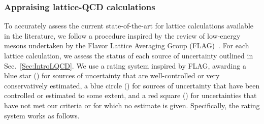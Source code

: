 \subsubsection{Appraising lattice-QCD calculations}
\label{subsubsec:BClQCD}

To accurately assess the current state-of-the-art for lattice calculations
available in the literature, we follow a procedure inspired by the review of 
low-energy mesons undertaken by the Flavor Lattice Averaging Group 
(FLAG)~\cite{Aoki:2016frl}. 
%
For each lattice calculation, we assess the status of each source of 
uncertainty outlined in Sec.~\ref{Sec:IntroLQCD}. 
%
We use a rating system inspired by FLAG, awarding a blue star (\bstar) for 
sources of uncertainty that are well-controlled or very conservatively 
estimated, a blue circle (\bcirc) for sources of uncertainty that have been 
controlled or estimated to some extent, and a red square (\rsquare) for 
uncertainties that have not met our criteria or for which no estimate is given.
%
Specifically, the rating system works as follows.

